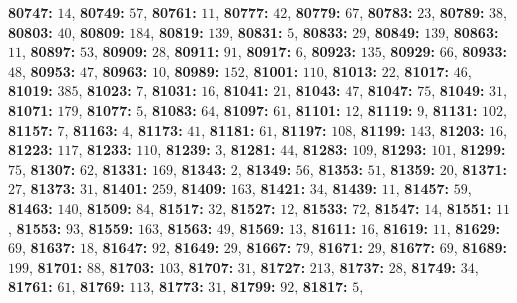 \textsf{\bfseries 80747:} $14$, \textsf{\bfseries 80749:} $57$, \textsf{\bfseries 80761:} $11$, \textsf{\bfseries 80777:} $42$, \textsf{\bfseries 80779:} $67$, \textsf{\bfseries 80783:} $23$, \textsf{\bfseries 80789:} $38$, \textsf{\bfseries 80803:} $40$, \textsf{\bfseries 80809:} $184$, \textsf{\bfseries 80819:} $139$, \textsf{\bfseries 80831:} $5$, \textsf{\bfseries 80833:} $29$, \textsf{\bfseries 80849:} $139$, \textsf{\bfseries 80863:} $11$, \textsf{\bfseries 80897:} $53$, \textsf{\bfseries 80909:} $28$, \textsf{\bfseries 80911:} $91$, \textsf{\bfseries 80917:} $6$, \textsf{\bfseries 80923:} $135$, \textsf{\bfseries 80929:} $66$, \textsf{\bfseries 80933:} $48$, \textsf{\bfseries 80953:} $47$, \textsf{\bfseries 80963:} $10$, \textsf{\bfseries 80989:} $152$, \textsf{\bfseries 81001:} $110$, \textsf{\bfseries 81013:} $22$, \textsf{\bfseries 81017:} $46$, \textsf{\bfseries 81019:} $385$, \textsf{\bfseries 81023:} $7$, \textsf{\bfseries 81031:} $16$, \textsf{\bfseries 81041:} $21$, \textsf{\bfseries 81043:} $47$, \textsf{\bfseries 81047:} $75$, \textsf{\bfseries 81049:} $31$, \textsf{\bfseries 81071:} $179$, \textsf{\bfseries 81077:} $5$, \textsf{\bfseries 81083:} $64$, \textsf{\bfseries 81097:} $61$, \textsf{\bfseries 81101:} $12$, \textsf{\bfseries 81119:} $9$, \textsf{\bfseries 81131:} $102$, \textsf{\bfseries 81157:} $7$, \textsf{\bfseries 81163:} $4$, \textsf{\bfseries 81173:} $41$, \textsf{\bfseries 81181:} $61$, \textsf{\bfseries 81197:} $108$, \textsf{\bfseries 81199:} $143$, \textsf{\bfseries 81203:} $16$, \textsf{\bfseries 81223:} $117$, \textsf{\bfseries 81233:} $110$, \textsf{\bfseries 81239:} $3$, \textsf{\bfseries 81281:} $44$, \textsf{\bfseries 81283:} $109$, \textsf{\bfseries 81293:} $101$, \textsf{\bfseries 81299:} $75$, \textsf{\bfseries 81307:} $62$, \textsf{\bfseries 81331:} $169$, \textsf{\bfseries 81343:} $2$, \textsf{\bfseries 81349:} $56$, \textsf{\bfseries 81353:} $51$, \textsf{\bfseries 81359:} $20$, \textsf{\bfseries 81371:} $27$, \textsf{\bfseries 81373:} $31$, \textsf{\bfseries 81401:} $259$, \textsf{\bfseries 81409:} $163$, \textsf{\bfseries 81421:} $34$, \textsf{\bfseries 81439:} $11$, \textsf{\bfseries 81457:} $59$, \textsf{\bfseries 81463:} $140$, \textsf{\bfseries 81509:} $84$, \textsf{\bfseries 81517:} $32$, \textsf{\bfseries 81527:} $12$, \textsf{\bfseries 81533:} $72$, \textsf{\bfseries 81547:} $14$, \textsf{\bfseries 81551:} $11$, \textsf{\bfseries 81553:} $93$, \textsf{\bfseries 81559:} $163$, \textsf{\bfseries 81563:} $49$, \textsf{\bfseries 81569:} $13$, \textsf{\bfseries 81611:} $16$, \textsf{\bfseries 81619:} $11$, \textsf{\bfseries 81629:} $69$, \textsf{\bfseries 81637:} $18$, \textsf{\bfseries 81647:} $92$, \textsf{\bfseries 81649:} $29$, \textsf{\bfseries 81667:} $79$, \textsf{\bfseries 81671:} $29$, \textsf{\bfseries 81677:} $69$, \textsf{\bfseries 81689:} $199$, \textsf{\bfseries 81701:} $88$, \textsf{\bfseries 81703:} $103$, \textsf{\bfseries 81707:} $31$, \textsf{\bfseries 81727:} $213$, \textsf{\bfseries 81737:} $28$, \textsf{\bfseries 81749:} $34$, \textsf{\bfseries 81761:} $61$, \textsf{\bfseries 81769:} $113$, \textsf{\bfseries 81773:} $31$, \textsf{\bfseries 81799:} $92$, \textsf{\bfseries 81817:} $5$, 
